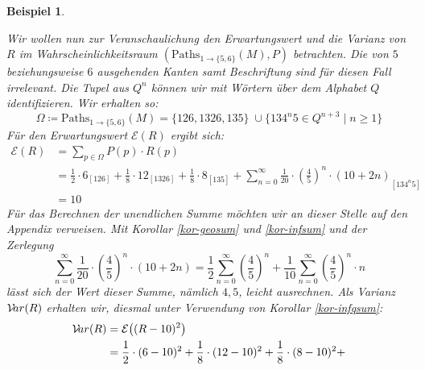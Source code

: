 \documentclass[a4paper]{article}
\newtheorem{beispiel}[satz]{Beispiel}
\theoremstyle{nonumberplain}
\begin{document}
\begin{beispiel}
\begin{center}
		\end{center}
		Wir wollen nun zur Veranschaulichung den Erwartungswert und die Varianz von $R$ im Wahrscheinlichkeitsraum $(\mathrm{Paths}_{1 \rightarrow \{5,6\}}(M), P)$ betrachten. Die von $5$ beziehungsweise $6$ ausgehenden Kanten samt Beschriftung sind für diesen Fall irrelevant. Die Tupel aus $Q^n$ können wir mit Wörtern über dem Alphabet $Q$ identifizieren. Wir erhalten so:
		\begin{equation*}
		\Omega \coloneqq \mathrm{Paths}_{1 \rightarrow \{5,6\}}(M) = \big\{126,1326,135\big\} \; \cup \big\{134^n5 \in Q^{n+3} \mid n\geq 1\big\} 
		\end{equation*}
		Für den Erwartungswert $\mathcal{E}(R)$ ergibt sich:
		\newcommand{\exres}{10}
		\begin{align*}
		\mathcal{E}(R) & = \sum_{p \in \Omega}{P(p) \cdot R(p)}\\
		& = \frac{1}{2}\cdot 6_{\scriptscriptstyle [126]} + \frac{1}{8}\cdot 12_{\scriptscriptstyle [1326]} + \frac{1}{8}\cdot 8_{\scriptscriptstyle [135]} + \sum_{n = 0}^{\infty}{\frac{1}{20}\cdot\left(\frac{4}{5}\right)^n \cdot (10 + 2n)}_{\scriptscriptstyle [134^n5]} \\
		& = \exres{}
		\end{align*}
		Für das Berechnen der unendlichen Summe möchten wir an dieser Stelle auf den Appendix verweisen. Mit Korollar \ref{kor-geosum} und \ref{kor-infsum} und der Zerlegung
		\begin{equation*}
		\sum_{n = 0}^{\infty}{\frac{1}{20}\cdot\left(\frac{4}{5}\right)^n \cdot (10 + 2n)}
		= \frac{1}{2}\sum_{n = 0}^{\infty}{\left(\frac{4}{5}\right)^n} + \frac{1}{10} \sum_{n = 0}^{\infty}{\left(\frac{4}{5}\right)^n \cdot n}
		\end{equation*}
		lässt sich der Wert dieser Summe, nämlich $4,5$, leicht ausrechnen.
		Als Varianz $\mathcal{V}\!ar(R)$ erhalten wir, diesmal unter Verwendung von Korollar \ref{kor-infqsum}:
		\begin{align*}
		\mvar(R) & = \mathcal{E}\big((R - \exres{})^2\big) \\
		& = \frac{1}{2}\cdot (6 - \exres)^2+ \frac{1}{8}\cdot (12-\exres)^2 + \frac{1}{8}\cdot (8-\exres)^2 + \\

\end{align*}
\end{beispiel}
\end{document}

